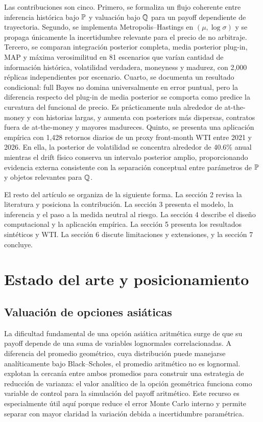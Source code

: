 Las contribuciones son cinco. Primero, se formaliza un flujo coherente entre inferencia histórica bajo $\mathbb{P}$ y valuación bajo $\mathbb{Q}$ para un payoff dependiente de trayectoria. Segundo, se implementa Metropolis--Hastings en $(\mu,\log\sigma)$ y se propaga únicamente la incertidumbre relevante para el precio de no arbitraje. Tercero, se comparan integración posterior completa, media posterior plug-in, MAP y máxima verosimilitud en 81 escenarios que varían cantidad de información histórica, volatilidad verdadera, moneyness y madurez, con 2,000 réplicas independientes por escenario. Cuarto, se documenta un resultado condicional: full Bayes no domina universalmente en error puntual, pero la diferencia respecto del plug-in de media posterior se comporta como predice la curvatura del funcional de precio. Es prácticamente nula alrededor de at-the-money y con historias largas, y aumenta con posteriors más dispersas, contratos fuera de at-the-money y mayores madureces. Quinto, se presenta una aplicación empírica con 1,428 retornos diarios de un proxy front-month WTI entre 2021 y 2026. En ella, la posterior de volatilidad se concentra alrededor de 40.6\% anual mientras el drift físico conserva un intervalo posterior amplio, proporcionando evidencia externa consistente con la separación conceptual entre parámetros de $\mathbb{P}$ y objetos relevantes para $\mathbb{Q}$.

El resto del artículo se organiza de la siguiente forma. La sección 2 revisa la literatura y posiciona la contribución. La sección 3 presenta el modelo, la inferencia y el paso a la medida neutral al riesgo. La sección 4 describe el diseño computacional y la aplicación empírica. La sección 5 presenta los resultados sintéticos y WTI. La sección 6 discute limitaciones y extensiones, y la sección 7 concluye.

\section{Estado del arte y posicionamiento}

\subsection{Valuación de opciones asiáticas}

La dificultad fundamental de una opción asiática aritmética surge de que su payoff depende de una suma de variables lognormales correlacionadas. A diferencia del promedio geométrico, cuya distribución puede manejarse analíticamente bajo Black--Scholes, el promedio aritmético no es lognormal. \citet{kemnavorst1990} explotan la cercanía entre ambos promedios para construir una estrategia de reducción de varianza: el valor analítico de la opción geométrica funciona como variable de control para la simulación del payoff aritmético. Este recurso es especialmente útil aquí porque reduce el error Monte Carlo interno y permite separar con mayor claridad la variación debida a incertidumbre paramétrica.

